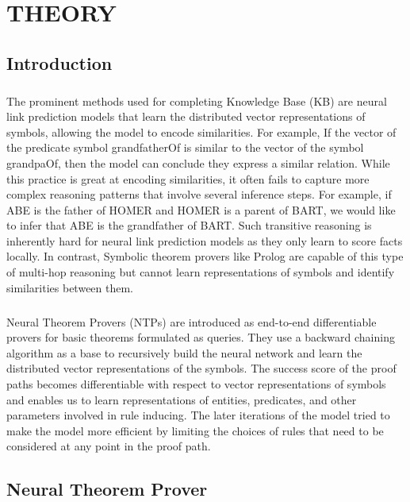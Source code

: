 \documentclass[Other]{iitddiss}
\begin{document}

\chapter{THEORY}
\section{Introduction}
\paragraph{}
The prominent methods used for completing Knowledge Base (KB) are neural link prediction models that learn the distributed vector representations of symbols, allowing the model to encode similarities.  For example, If the vector of the predicate symbol grandfatherOf is similar to the vector of the symbol grandpaOf, then the model can conclude they express a similar relation. While this practice is great at encoding similarities, it often fails to capture more complex reasoning patterns that involve several inference steps. For example, if ABE is the father of HOMER and HOMER is a parent of BART, we would like to infer that ABE is the grandfather of BART. Such transitive reasoning is inherently hard for neural link prediction models as they only learn to score facts locally. In contrast, Symbolic theorem provers like Prolog are capable of this type of multi-hop reasoning but cannot learn representations of symbols and identify similarities between them.

\paragraph{}
Neural Theorem Provers (NTPs) are introduced as end-to-end differentiable provers for basic theorems formulated as queries. They use a backward chaining algorithm as a base to recursively build the neural network and learn the distributed vector representations of the symbols. The success score of the proof paths becomes differentiable with respect to vector representations of symbols and enables us to learn representations of entities, predicates, and other parameters involved in rule inducing. The later iterations of the model tried to make the model more efficient by limiting the choices of rules that need to be considered at any point in the proof path.



\section{Neural Theorem Prover}
\end{document}
